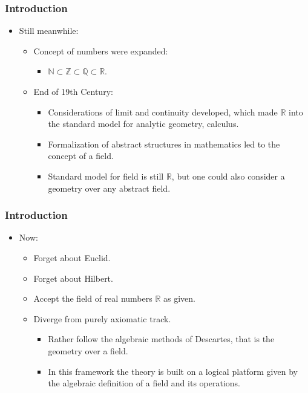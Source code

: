 \documentclass[compress,mathserif,serif]{beamer}
\begin{document}
\begin{frame}
\frametitle{Introduction}
\begin{itemize}
\item Still meanwhile:
\pause
\begin{itemize}
\item Concept of numbers were expanded:
\pause
\begin{itemize}
\item $\mathbb{N} \subset \mathbb{Z} \subset \mathbb{Q} \subset \mathbb{R}$.
\end{itemize}
\pause
\item End of 19th Century:
\pause
\begin{itemize}
\item Considerations of limit and continuity developed, which made $\mathbb{R}$ into the standard model for analytic geometry, calculus. 
\pause
\item Formalization of abstract structures in mathematics led to the concept of a field.
\pause
\item Standard model for field is still $\mathbb{R}$, but one could also consider a geometry over any abstract field.
\end{itemize}
\end{itemize}
\end{itemize}
\end{frame}

\begin{frame}
\frametitle{Introduction}
\begin{itemize}
\item Now: 
\pause
\begin{itemize}
\item Forget about Euclid.
\pause
\item Forget about Hilbert.
\pause
\item  Accept the field of real numbers $\mathbb{R}$ as given.
\pause 
\item Diverge from purely axiomatic track.
\pause
\begin{itemize}
\item Rather follow the algebraic methods of Descartes, that is the geometry over a field.
\pause
\item  In this framework the theory is built on a logical platform given by the algebraic definition of a field and its operations.
\end{itemize}
\end{itemize}
\end{itemize}
\end{frame}
\end{document}
